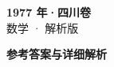 \documentclass[zihao=-4, a4paper]{ctexart}
\begin{document}
\begin{center}
  {\Large\bfseries 1977 年·四川卷}\\[4pt]
  {\large 数学 · 解析版}
\end{center}
\medskip
{}

\clearpage
{}
\begin{center}{\Large\bfseries 参考答案与详细解析}\end{center}
\medskip

\end{document}
